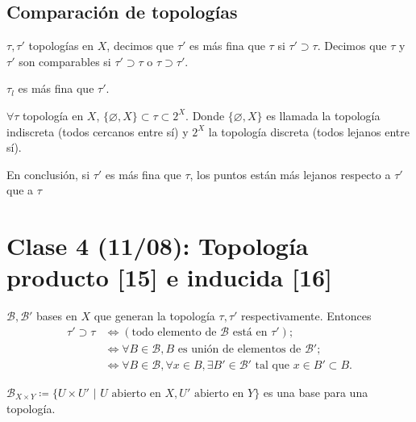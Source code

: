 \documentclass[a4paper]{report}
\begin{document}
	\subsection{Comparación de topologías}

	\begin{definition}
		$\tau,\tau'$ topologías en $X$, decimos que $\tau'$ es más fina que $\tau$ si $\tau' \supset \tau$. Decimos que $\tau$ y $\tau'$ son comparables si $\tau' \supset \tau$ o $\tau \supset \tau'$. 
	\end{definition}

	\begin{eg}
		$\tau_l$ es más fina que $\tau'$.
	\end{eg}

	\begin{eg}
		$\forall \tau$ topología en $X$, $\{ \varnothing, X \} \subset \tau \subset 2^X$. Donde $\{ \varnothing, X \}$ es llamada la topología indiscreta (todos cercanos entre sí) y $2^X$ la topología discreta (todos lejanos entre sí).    
	\end{eg}

	En conclusión, si $\tau'$ es más fina que $\tau$, los puntos están más lejanos respecto a $\tau'$ que a $\tau$

	\section{Clase 4 (11/08): Topología producto [15] e inducida [16]}

	\begin{lemma}
		$\mathcal{B},\mathcal{B}'$ bases en $X$ que generan la topología $\tau,\tau'$ respectivamente. Entonces
		\begin{align*}
			\tau' \supset \tau & \iff (\text{todo elemento de } \mathcal{B} \text{ está en } \tau'); \\
			& \iff \forall B \in \mathcal{B}, B \text{ es unión de elementos de } \mathcal{B}'; \\
			& \iff \forall B \in \mathcal{B}, \forall x \in B, \exists B' \in \mathcal{B}' \text{ tal que } x \in B' \subset B
		.\end{align*}
	\end{lemma}

	\begin{lemma}
		$\mathcal{B}_{X \times Y} \coloneq \{ U \times U' \text{ | } U \text{ abierto en } X, U' \text{ abierto en } Y \}$ es una base para una topología.
	\end{lemma}
\end{document}
